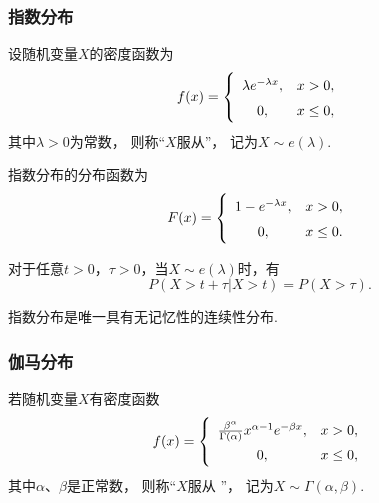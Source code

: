 \subsubsection{指数分布}
\begin{definition}
设随机变量\(X\)的密度函数为\begin{equation}\label{equation:连续型分布.指数分布的密度函数}
	f(x) = \left\{ \def\arraystretch{1.5} \begin{array}{cl}
		\lambda e^{-\lambda x}, & x > 0, \\
		0, & x \leq 0, \\
	\end{array} \right.
\end{equation}
其中\(\lambda > 0\)为常数，
则称“\(X\)服从”，
记为\(X \sim e(\lambda)\).
\end{definition}

\begin{theorem}
指数分布的分布函数为\begin{equation}
	F(x) = \left\{ \def\arraystretch{1.5}
	\begin{array}{cl}
		1 - e^{-\lambda x}, & x > 0, \\
		0, & x \leq 0. \\
	\end{array} \right.
\end{equation}
\end{theorem}

\begin{theorem}[指数分布的无记忆性]
对于任意\(t > 0\)，\(\tau > 0\)，当\(X \sim e(\lambda)\)时，有\begin{equation*}
	P(X > t + \tau \vert X > t) = P(X > \tau).
\end{equation*}
\end{theorem}
\begin{remark}
指数分布是唯一具有无记忆性的连续性分布.
\end{remark}

\subsubsection{伽马分布}
\begin{definition}
若随机变量\(X\)有密度函数\begin{equation}\label{equation:连续型分布.伽马分布的密度函数}
	f(x) = \left\{ \def\arraystretch{1.5} \begin{array}{cl}
		\frac{\beta^\alpha}{\Gamma(\alpha)} x^{\alpha-1} e^{-\beta x},
			& x > 0, \\
		0, & x \leq 0, \\
	\end{array} \right.
\end{equation}
其中\(\alpha\)、\(\beta\)是正常数，
则称“\(X\)服从 ”，
记为\(X \sim \Gamma(\alpha,\beta)\).
\end{definition}

